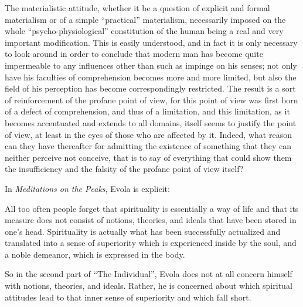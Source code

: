 \begin{quotex}
The materialistic attitude, whether it be a question of explicit and formal materialism or of a simple ``practical'' materialism, necessarily imposed on the whole ``psycho-physiological'' constitution of the human being a real and very important modification. This is easily understood, and in fact it is only necessary to look around in order to conclude that modern man has become quite impermeable to any influences other than such as impinge on his senses; not only have his faculties of comprehension becomes more and more limited, but also the field of his perception has become correspondingly restricted. The result is a sort of reinforcement of the profane point of view, for this point of view was first born of a defect of comprehension, and thus of a limitation, and this limitation, as it becomes accentuated and extends to all domains, itself seems to justify the point of view, at least in the eyes of those who are affected by it. Indeed, what reason can they have thereafter for admitting the existence of something that they can neither perceive not conceive, that is to say of everything that could show them the insufficiency and the falsity of the profane point of view itself?
\end{quotex}


In \emph{Meditations on the Peaks}, Evola is explicit:

\begin{quotex}
All too often people forget that spirituality is essentially a way of life and that its measure does not consist of notions, theories, and ideals that have been stored in one's head. Spirituality is actually what has been successfully actualized and translated into a sense of superiority which is experienced inside by the soul, and a noble demeanor, which is expressed in the body.
\end{quotex}


So in the second part of ``The Individual'', Evola does not at all concern himself with notions, theories, and ideals. Rather, he is concerned about which spiritual attitudes lead to that inner sense of superiority and which fall short.


